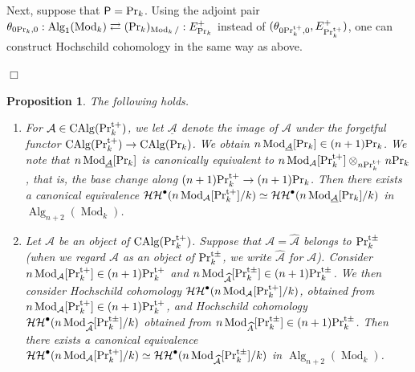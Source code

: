 \documentclass[leqno,12pt]{amsart}
\theoremstyle{plain}
\newtheorem{Proposition}[Theorem]{Proposition}
\theoremstyle{definition}
\newcommand{\HH}{\operatorname{\mathcal{HH}}}
\newcommand{\AAA}{\mathcal{A}}
\newcommand{\PR}{\textup{Pr}}
\newcommand{\PRTT}{\textup{Pr}^{\textup{t}+}}
\newcommand{\PRTTT}{\textup{Pr}^{\textup{t}\pm}}
\newcommand{\Mod}{\operatorname{Mod}}
\newcommand{\Alg}{\operatorname{Alg}}
\newcommand{\CAlg}{\operatorname{CAlg}}
\newcommand{\QED}{{\unskip\nobreak\hfil\penalty50\quad\null\nobreak\hfil
{$\Box$}\parfillskip0pt\finalhyphendemerits0\par\medskip}}
\begin{document}
Next, suppose that $\mathsf{P}=\PR_k$.
Using the adjoint pair $\theta_{0\PR_k,0}:\Alg_1(\Mod_k)\rightleftarrows (\PR_k)_{\Mod_k/}:E_{\PR_k}^+$ instead of $(\theta_{0\PRTT_k,0},E_{\PRTT_k}^+)$,
one can construct Hochschild cohomology in the same way as above.
\QED




\begin{Proposition}
\label{comparison2}
The following holds.
\begin{enumerate}
\item
For $\mathcal{A}\in \CAlg(\PRTT_k)$, we
let $\underline{\AAA}$ denote the image of $\AAA$ under the forgetful functor $\CAlg(\PRTT_k)\to \CAlg(\PR_k)$.
We obtain $n\Mod_{\underline{\AAA}}[\PR_k]\in (n+1)\PR_k$.
We note that $n\Mod_{\underline{\AAA}}[\PR_k]$ is canonically equivalent to $n\Mod_{\AAA}[\PRTT_k]\otimes_{n\PRTT_k}n\PR_k$,
that is, the base change along $(n+1)\PRTT_k\to (n+1)\PR_k$.
Then there exists a canonical equivalence
$\HH^\bullet(n\Mod_{\AAA}[\PRTT_k]/k)\simeq \HH^\bullet(n\Mod_{\underline{\AAA}}[\PR_k]/k)$
in $\Alg_{n+2}(\Mod_k)$.

\item Let $\AAA$ be an object of $\CAlg(\PRTT_k)$. Suppose that $\AAA=\widehat{\AAA}$ belongs to $\PRTTT_k$ 
(when we regard $\AAA$ as an object of $\PRTTT_k$, we write $\widehat{\AAA}$ for $\AAA$).
Consider $n\Mod_{\AAA}[\PRTT_k]\in (n+1)\PRTT_k$ and $n\Mod_{\widehat{\AAA}}[\PRTTT_k]\in (n+1)\PRTTT_k$.
We then consider Hochschild cohomology $\HH^\bullet(n\Mod_{\AAA}[\PRTT_k]/k)$, obtained from $n\Mod_{\AAA}[\PRTT_k]\in (n+1)\PRTT_k$,
and Hochschild cohomology $\HH^\bullet(n\Mod_{\widehat{\AAA}}[\PRTTT_k]/k)$ obtained from $n\Mod_{\widehat{A}}[\PRTTT_k]\in (n+1)\PRTTT_k$.
Then there exists a canonical equivalence
$\HH^\bullet(n\Mod_{\AAA}[\PRTT_k]/k)\simeq \HH^\bullet(n\Mod_{\widehat{\AAA}}[\PRTTT_k]/k)$
in $\Alg_{n+2}(\Mod_k)$.
\end{enumerate}
\end{Proposition}
\end{document}
